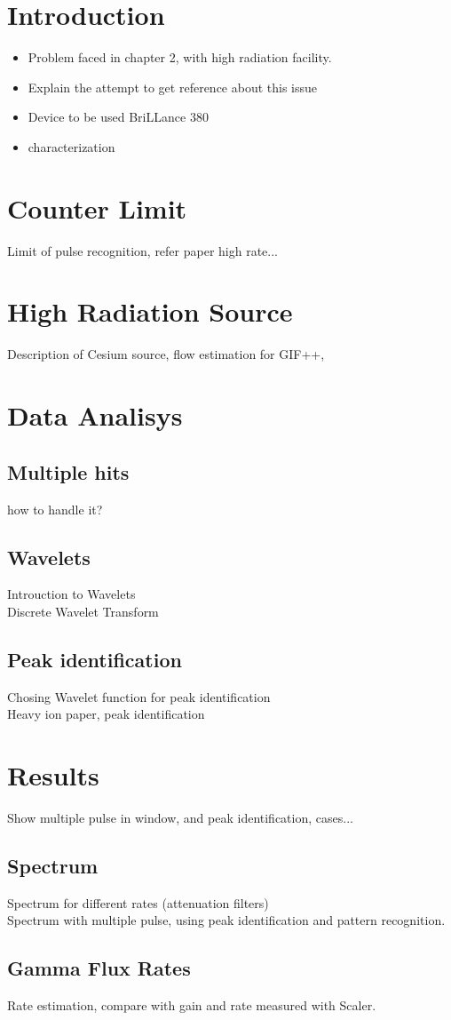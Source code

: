\section{Introduction}
\begin{itemize}
\item Problem faced in chapter 2, with high radiation facility.
\item Explain the attempt to get reference about this issue
\item Device to be used BriLLance 380
\item characterization
\end{itemize}
\section{Counter Limit}
Limit of pulse recognition, refer paper high rate...
\section{High Radiation Source}
Description of Cesium source, flow estimation for GIF++, 
\section{Data Analisys}
\subsection{Multiple hits}
how to handle it?\\
\subsection{Wavelets}
Introuction to Wavelets\\
Discrete Wavelet Transform\\
\subsection{Peak identification}
Chosing Wavelet function for peak identification\\
Heavy ion paper, peak identification\\
\section{Results}
Show multiple pulse in window, and peak identification, cases...
\subsection{Spectrum}
Spectrum for different rates (attenuation filters)\\
Spectrum with multiple pulse, using peak identification and pattern recognition.\\
\subsection{Gamma Flux Rates}
Rate estimation, compare with gain and rate measured with Scaler.





